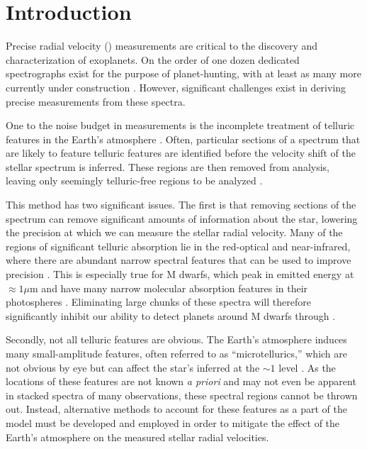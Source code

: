 \documentclass[twocolumn]{aastex62}
\begin{document}

\section{Introduction}

Precise radial velocity (\RV) measurements are critical to the discovery and characterization of exoplanets. 
On the order of one dozen dedicated spectrographs exist for the purpose of \RV planet-hunting, with at least as many more currently under construction \citep{Wright2017}. 
However, significant challenges exist in deriving precise \RV measurements from these spectra. 

One  to the noise budget in \RV measurements is the incomplete treatment of telluric features in the Earth's atmosphere \citep{Halverson2016}. 
Often, particular sections of a spectrum that are likely to feature telluric features are identified before the velocity shift of the stellar spectrum is inferred. 
These regions are then removed from analysis, leaving only seemingly telluric-free regions to be analyzed \citep[e.g.][]{AngladaEscude2012}.

This method has two significant issues. 
The first is that removing sections of the spectrum can remove significant amounts of information about the star, lowering the precision at which we can measure the stellar radial velocity. 
Many of the regions of significant telluric absorption lie in the red-optical and near-infrared, where there are abundant narrow spectral features that can be used to improve \RV precision \citep{Bottom2013}. 
This is especially true for M dwarfs, which peak in emitted energy at $\approx 1 \mu$m and have many narrow molecular absorption features in their photospheres \citep{Figueira2016}. 
Eliminating large chunks of these spectra will therefore significantly inhibit our ability to detect planets around M dwarfs through \RVs.

Secondly, not all telluric features are obvious. 
The Earth's atmosphere induces many small-amplitude features, often referred to as ``microtellurics,'' which are not obvious by eye but can affect the star's inferred \RV at the $\sim 1$ \ms level \citep{Cunha2014}. 
As the locations of these features are not known \textit{a priori} and may not even be apparent in stacked spectra of many observations, these spectral regions cannot be thrown out. 
Instead, alternative methods to account for these features as a part of the model must be developed and employed in order to mitigate the effect of the Earth's atmosphere on the measured stellar radial velocities.
\end{document}
